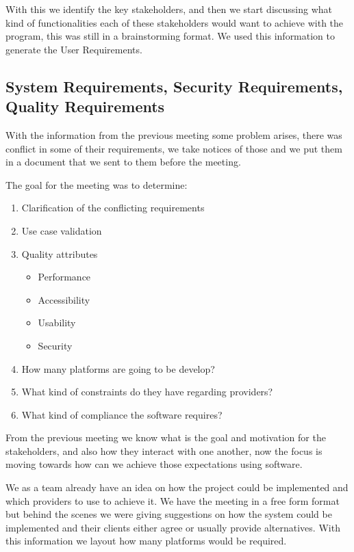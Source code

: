 \pagebreak

\noindent With this we identify the key stakeholders, and then we start 
discussing what kind of functionalities each of these stakeholders would want 
to achieve with the program, this was still in a brainstorming format. We used 
this information to generate the User Requirements.

\subsection{System Requirements, Security Requirements, Quality Requirements}
With the information from the previous meeting some problem arises, there was 
conflict in some of their requirements, we take notices of those and we put 
them in a document that we sent to them before the meeting. 

The goal for the meeting was to determine:
\begin{enumerate}
    \item Clarification of the conflicting requirements
    \item Use case validation
    \item Quality attributes
    \begin{itemize}
        \item Performance
        \item Accessibility 
        \item Usability
        \item Security
    \end{itemize}
    \item How many platforms are going to be develop?
    \item What kind of constraints do they have regarding providers?
    \item What kind of compliance the software requires?
\end{enumerate}

\noindent From the previous meeting we know what is the goal and motivation 
for the stakeholders, and also how they interact with one another, now the 
focus is moving towards how can we achieve those expectations using software. 

\noindent We as a team already have an idea on how the project could be 
implemented and which providers to use to achieve it. We have the meeting in a 
free form format but behind the scenes we were giving suggestions on how the 
system could be implemented and their clients either agree or usually provide 
alternatives. With this information we layout how many platforms 
would be required. \newline

